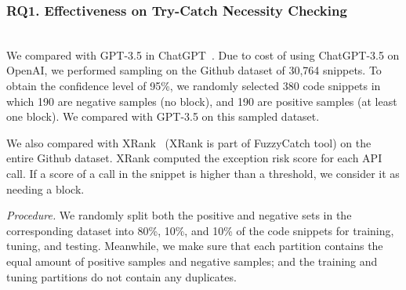 \subsubsection{RQ1. Effectiveness on Try-Catch Necessity Checking}~\\
 We compared {\xblock} with
GPT-3.5 in ChatGPT~\cite{ChatGPT}. Due to cost of using ChatGPT-3.5 on
OpenAI, we performed sampling on the Github dataset of 30,764
snippets. To obtain the confidence level of 95\%, we randomly selected
380 code snippets in which 190 are negative samples
(no  block), and 190 are positive samples (at least
one  block). We compared with GPT-3.5 on this sampled
dataset.

We also compared {\xblock} with XRank~\cite{xrank-fse20} (XRank is
part of FuzzyCatch tool) on the entire Github dataset. XRank computed
the exception risk score for each API call. If a score of a call in
the snippet is higher than a threshold, we consider it as needing a
 block.

{\em Procedure.} We randomly split both the positive and negative sets
in the corresponding dataset into 80\%, 10\%, and 10\% of the code
snippets for training, tuning, and testing. Meanwhile, we make sure
that each partition contains the equal amount of positive samples and
negative samples; and the training and tuning partitions do not
contain any duplicates. 

